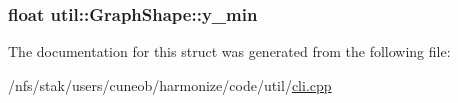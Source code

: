 \hypertarget{structutil_1_1GraphShape_a77f1ae632409b490e36f2f01a09035d0}{
\subsubsection[{y\-\_\-min}]{\setlength{\rightskip}{0pt plus 5cm}float util\-::\-Graph\-Shape\-::y\-\_\-min}}\label{structutil_1_1GraphShape_a77f1ae632409b490e36f2f01a09035d0}


The documentation for this struct was generated from the following file\-:\begin{DoxyCompactItemize}
\item 
/nfs/stak/users/cuneob/harmonize/code/util/\hyperlink{cli_8cpp}{cli.\-cpp}\end{DoxyCompactItemize}
